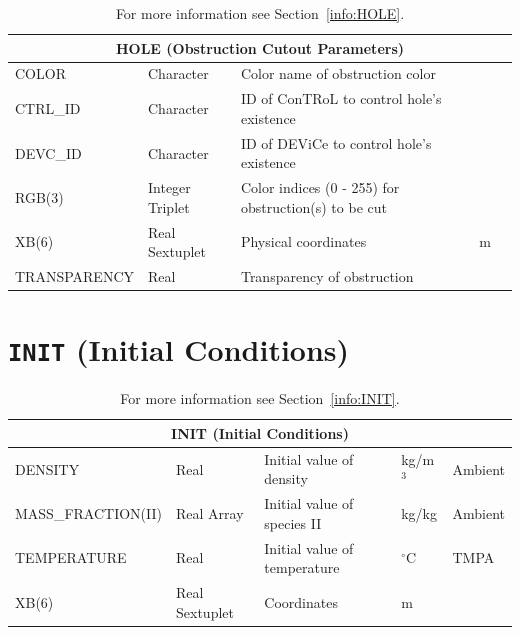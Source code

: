 \documentclass[11pt]{book}
\begin{document}
\begin{table}[H]
\caption{For more information see Section~\ref{info:HOLE}.}\label{tbl:HOLE}
\noindent
\begin{tabular*}{\textwidth}{@{\extracolsep{\fill}}|l|l|l|l|l|}
\hline
\multicolumn{5}{|c|}{{\ct HOLE} (Obstruction Cutout Parameters)} \\ \hline \hline
{\ct COLOR    }    & Character         & Color name of obstruction color                           &       &           \\ \hline
{\ct CTRL\_ID}     & Character         & {\ct ID} of {\ct ConTRoL} to control hole's existence     &       &           \\ \hline
{\ct DEVC\_ID}     & Character         & {\ct ID} of {\ct DEViCe} to control hole's existence      &       &           \\ \hline
{\ct RGB(3)   }    & Integer Triplet   & Color indices (0 - 255) for obstruction(s) to be cut      &       &           \\ \hline %
{\ct XB(6)    }    & Real Sextuplet    & Physical coordinates                                      & m     &           \\ \hline
{\ct TRANSPARENCY} & Real              & Transparency of obstruction                               &       &           \\ \hline
\end{tabular*}
\end{table}

\vspace{\baselineskip}

\vfill


\section{\texorpdfstring{{\tt INIT}}{INIT} (Initial Conditions)}

\hspace{1in}

\begin{table}[H]
\caption{For more information see Section~\ref{info:INIT}.}\label{tbl:INIT}
\noindent
\begin{tabular*}{\textwidth}{@{\extracolsep{\fill}}|l|l|l|l|l|}
\hline
\multicolumn{5}{|c|}{{\ct INIT} (Initial Conditions)} \\ \hline \hline
{\ct DENSITY}               & Real              & Initial value of density                          & kg/m$^3$      & Ambient       \\ \hline
{\ct MASS\_FRACTION(II)}    & Real Array        & Initial value of species {\ct II}                 & kg/kg         & Ambient       \\ \hline
{\ct TEMPERATURE}           & Real              & Initial value of temperature                      & $^\circ$C     & {\ct TMPA}    \\ \hline
{\ct XB(6)}                 & Real Sextuplet    & Coordinates                                       & m             &               \\ \hline
\end{tabular*}
\end{table}
\end{document}
